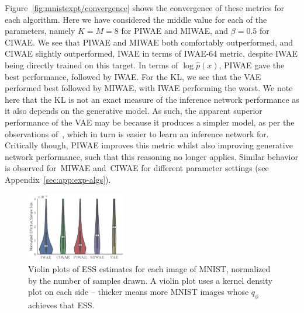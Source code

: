 Figure~\ref{fig:mnistexpt/convergence} shows the convergence of these metrics
for each algorithm.  Here we have considered
the middle value for each of the parameters, namely $K=M=8$
for \gls{PIWAE} and \gls{MIWAE}, and $\beta=0.5$ for \gls{CIWAE}.  
We see that \gls{PIWAE} and \gls{MIWAE} both
comfortably outperformed, and \gls{CIWAE} slightly outperformed,
\gls{IWAE} in terms of \gls{IWAE}-64 metric, despite
\gls{IWAE} being directly trained on this target.  In terms of 
$\log \hat{p}(x)$, \gls{PIWAE} gave the best performance, 
followed by \gls{IWAE}.  For the \textsc{KL}, we see that
the \gls{VAE} performed best followed by \gls{MIWAE}, 
with \gls{IWAE} performing the worst.  
We note here that the \textsc{KL} is not an exact
measure of the inference network performance as it also depends on the generative model.
As such, the apparent superior performance of the \gls{VAE} may be because it produces a
simpler model, as per the observations of~\citet{burda2016importance}, which in turn is easier
to learn an inference network for.  Critically though,
\gls{PIWAE} improves this metric whilst also improving generative network performance, such
that this reasoning no longer applies.  Similar behavior is observed for~\gls{MIWAE} and~\gls{CIWAE}
for different parameter settings (see Appendix~\ref{sec:app:exp-algs}).



\begin{figure}[t!]
	\centering
	\includegraphics[width=0.39\textwidth]{figures/tighter_bounds/ess_violin}\vspace{-10pt}
	\caption{Violin plots of ESS estimates for each image of MNIST,
		normalized by the number of samples drawn. A violin plot uses a kernel density plot on each side -- thicker means more MNIST images whose $q_{\phi}$ achieves that ESS. 
		\vspace{-17pt}  \label{fig:violiness}}
\end{figure}

